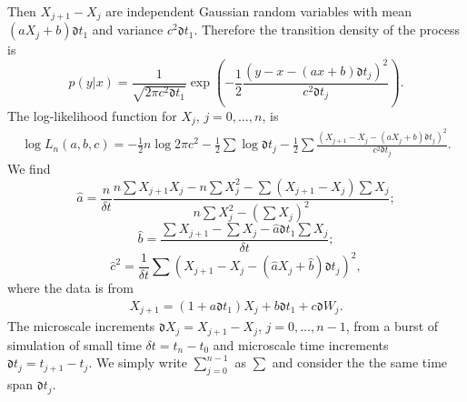 \documentclass[12pt,reqno, a4paper]{article}
\numberwithin{equation}{section}
\begin{document}
Then $X_{j+1}-X_j$ are independent Gaussian random variables with mean $(a X_j+b)\mathfrak{d} t_1$ and variance $c^2\mathfrak{d} t_1$. Therefore the transition density of the process is
 $$p(y|x)=\frac 1 {\sqrt{2\pi c^2\mathfrak{d} t_1}}\exp(-\frac 1 2\frac {\left(y-x-(a x+b)\mathfrak{d} t_j\right)^2}{c^2\mathfrak{d} t_j}).$$
The log-likelihood function for $X_j$, $j=0,\ldots, n$, is
\begin{eqnarray*}
\log L_n(a,b,c)=-\frac 1 2 n\log 2\pi c^2-\frac 1 2 \sum \log \mathfrak{d}  t_j-\frac 1 2 \sum \frac { (X_{j+1}-X_{j}-(aX_{j}+b)\mathfrak{d}  t_{j})^2}{ {c^2} \mathfrak{d}  t_j}. \nonumber
\end{eqnarray*}We find
$$\hat{a}=\frac n {\delta t} \frac {n\sum X_{j+1}X_j-n\sum X_j^2-\sum( X_{j+1}- X_j) \sum X_j}{n\sum X_j^2-(\sum X_j)^2};$$
$$\hat{b}=\frac { \sum X_{j+1}-\sum X_{j}-\hat{a}\mathfrak{d} t_1\sum X_j}{\delta t};$$
$$\hat{c}^2=\frac 1 {\delta t} \sum{(X_{j+1}-X_{j}-(\hat{a}X_{j}+\hat{b})\mathfrak{d}  t_{j})^2}, $$
where the data is from
\begin{eqnarray}\label{e22}
X_{j+1}=(1+a\mathfrak{d} t_1) X_j+b\mathfrak{d} t_1+c\mathfrak{d} W_j.\end{eqnarray}
The microscale increments $\mathfrak{d} X_j= X_{j+1}- X_{j}$, $j=0, \ldots, n-1$, from a burst of simulation of small time $\delta t=t_n-t_0$  and microscale time increments $\mathfrak{d} t_j=t_{j+1}-t_j$.  We simply write $\sum_{j=0}^{n-1}$ as $\sum$ and consider the the same time span $\mathfrak{d} t_j$.
\end{document}

